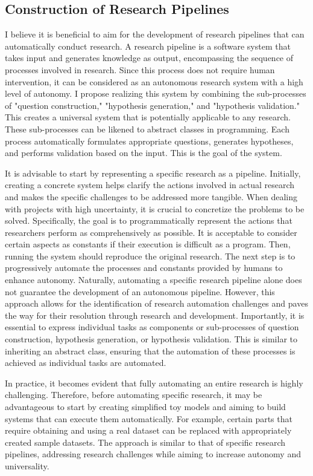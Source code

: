\documentclass{book}
\begin{document}
\subsection{Construction of Research Pipelines}

I believe it is beneficial to aim for the development of research pipelines that can automatically conduct research. A research pipeline is a software system that takes input and generates knowledge as output, encompassing the sequence of processes involved in research. Since this process does not require human intervention, it can be considered as an autonomous research system with a high level of autonomy. I propose realizing this system by combining the sub-processes of "question construction," "hypothesis generation," and "hypothesis validation." This creates a universal system that is potentially applicable to any research. These sub-processes can be likened to abstract classes in programming. Each process automatically formulates appropriate questions, generates hypotheses, and performs validation based on the input. This is the goal of the system.

It is advisable to start by representing a specific research as a pipeline. Initially, creating a concrete system helps clarify the actions involved in actual research and makes the specific challenges to be addressed more tangible. When dealing with projects with high uncertainty, it is crucial to concretize the problems to be solved. Specifically, the goal is to programmatically represent the actions that researchers perform as comprehensively as possible. It is acceptable to consider certain aspects as constants if their execution is difficult as a program. Then, running the system should reproduce the original research. The next step is to progressively automate the processes and constants provided by humans to enhance autonomy. Naturally, automating a specific research pipeline alone does not guarantee the development of an autonomous pipeline. However, this approach allows for the identification of research automation challenges and paves the way for their resolution through research and development. Importantly, it is essential to express individual tasks as components or sub-processes of question construction, hypothesis generation, or hypothesis validation. This is similar to inheriting an abstract class, ensuring that the automation of these processes is achieved as individual tasks are automated.

In practice, it becomes evident that fully automating an entire research is highly challenging. Therefore, before automating specific research, it may be advantageous to start by creating simplified toy models and aiming to build systems that can execute them automatically. For example, certain parts that require obtaining and using a real dataset can be replaced with appropriately created sample datasets. The approach is similar to that of specific research pipelines, addressing research challenges while aiming to increase autonomy and universality.
\end{document}
